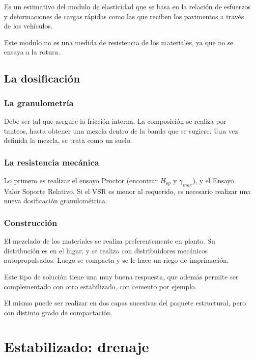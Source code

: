 \documentclass[../main.tex]{subfiles}
\begin{document}
Es un estimativo del modulo de elasticidad que se basa en la relación de 
esfuerzos y deformaciones de cargas rápidas como las que reciben los pavimentos
a través de los vehículos.

Este modulo no es una medida de resistencia de los materiales, ya que no se
ensaya a la rotura.

\subsection{La dosificación}

\subsubsection{La granulometría}

Debe ser tal que asegure la fricción interna. La composición se realiza
por tanteos, hasta obtener una mezcla dentro de la banda que se sugiere.
Una vez definida la mezcla, se trata como un suelo.

\subsubsection{La resistencia mecánica}

Lo primero es realizar el ensayo Proctor (encontrar $H_{op}$ y $\gamma_{max}$),
y el Ensayo Valor Soporte Relativo. Si el VSR es menor al requerido, es 
necesario realizar una nueva dosificación granulométrica.

\subsubsection{Construcción}

El mezclado de los materiales se realiza preferentemente en planta. 
Su distribución es en el lugar, y se realiza con distribuidores mecánicos
autopropulsados. Luego se compacta y se le hace un riego de imprimación.

Este tipo de solución tiene una muy buena respuesta, que además permite ser 
complementado con otro estabilizado, con cemento por ejemplo. 

El mismo puede ser realizar en dos capas sucesivas del paquete estructural,
pero con distinto grado de compactación.

\section{Estabilizado: drenaje}
\end{document}
